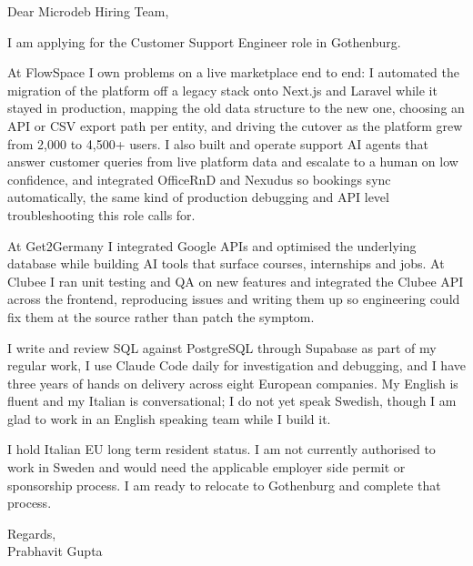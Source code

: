 \documentclass[a4paper,11pt]{article}
\begin{document}
Dear Microdeb Hiring Team,

I am applying for the Customer Support Engineer role in Gothenburg.

At FlowSpace I own problems on a live marketplace end to end: I automated the migration of the platform off a legacy stack onto Next.js and Laravel while it stayed in production, mapping the old data structure to the new one, choosing an API or CSV export path per entity, and driving the cutover as the platform grew from 2,000 to 4,500+ users. I also built and operate support AI agents that answer customer queries from live platform data and escalate to a human on low confidence, and integrated OfficeRnD and Nexudus so bookings sync automatically, the same kind of production debugging and API level troubleshooting this role calls for.

At Get2Germany I integrated Google APIs and optimised the underlying database while building AI tools that surface courses, internships and jobs. At Clubee I ran unit testing and QA on new features and integrated the Clubee API across the frontend, reproducing issues and writing them up so engineering could fix them at the source rather than patch the symptom.

I write and review SQL against PostgreSQL through Supabase as part of my regular work, I use Claude Code daily for investigation and debugging, and I have three years of hands on delivery across eight European companies. My English is fluent and my Italian is conversational; I do not yet speak Swedish, though I am glad to work in an English speaking team while I build it.

I hold Italian EU long term resident status. I am not currently authorised to work in Sweden and would need the applicable employer side permit or sponsorship process. I am ready to relocate to Gothenburg and complete that process.

Regards,\\
Prabhavit Gupta
\end{document}
